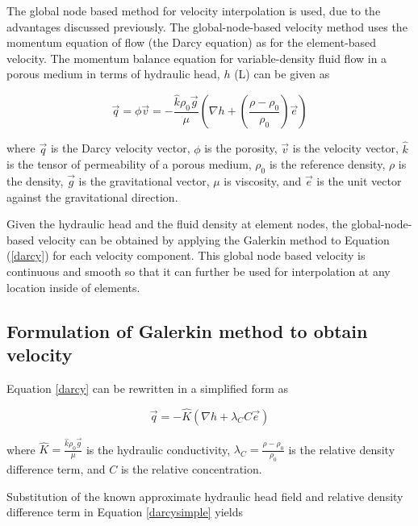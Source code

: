 The global node based method for velocity interpolation is used, due to the advantages discussed previously. The global-node-based velocity method uses the momentum equation of flow (the Darcy equation) as for the element-based velocity. The momentum balance equation for variable-density fluid flow in a porous medium in terms of hydraulic head, $h$ (L) can be given as \cite{cV87,hD98,pK96,pF98,gY81,cP04}

\begin{equation}\label{darcy}
\vec q = \phi \vec v = - \frac{{\hat k\rho _0 \vec g}}{\mu }\left( {\nabla h + \left( {\frac{{\rho - \rho _0 }}{{\rho _0 }}} \right)\vec e} \right)
\end{equation}

where $\vec q$ is the Darcy velocity vector, $\phi$ is the porosity, $\vec v$ is the  velocity vector, $\hat k$  is the tensor of permeability of a porous medium, $\rho _0$ is the reference density, $\rho$ is the density, $\vec g$ is the gravitational vector, $\mu$ is viscosity, and $\vec e$ is the unit vector against the gravitational direction.

Given the hydraulic head and the fluid density at element nodes, the global-node-based velocity can be obtained by applying the Galerkin method to Equation (\ref{darcy}) for each velocity component. This global node based velocity is continuous and smooth so that it can further be used for interpolation at any location inside of elements.

\subsection{Formulation of Galerkin method to obtain velocity}

Equation \ref{darcy} can be rewritten in a simplified form as

\begin{equation}\label{darcysimple}
\vec q = - \hat K(\nabla h + \lambda _C C\vec e)
\end{equation}

where $\hat K=\frac{{\hat k\rho _0 \vec g}}{\mu }$ is the hydraulic conductivity, $\lambda _C = \frac{\rho - \rho _0 }{\rho _0 }$ is the relative density difference term, and $C$ is the relative concentration.

Substitution of the known approximate hydraulic head field and relative density difference term in Equation \ref{darcysimple} yields

